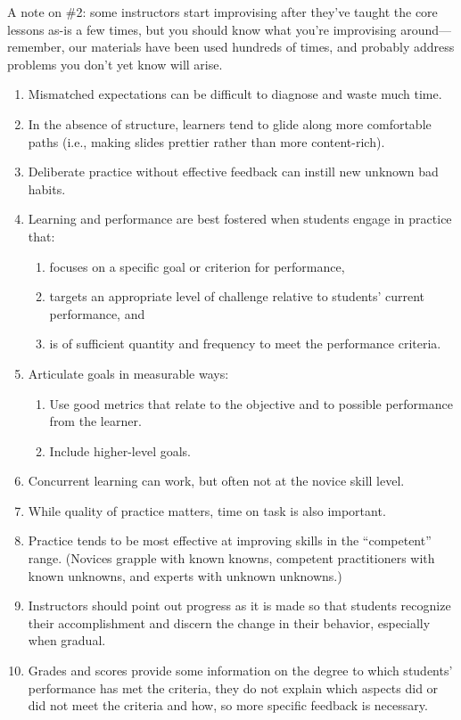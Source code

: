 A note on \#2: some instructors start improvising after they've taught
the core lessons as-is a few times, but you should know what you're
improvising around---remember, our materials have been used hundreds of
times, and probably address problems you don't yet know will arise.


\begin{enumerate}
\item
  Mismatched expectations can be difficult to diagnose and waste much
  time.
\item
  In the absence of structure, learners tend to glide along more
  comfortable paths (i.e., making slides prettier rather than more
  content-rich).
\item
  Deliberate practice without effective feedback can instill new unknown
  bad habits.
\item
  Learning and performance are best fostered when students engage in
  practice that:

  \begin{enumerate}
    \item
    focuses on a specific goal or criterion for performance,
  \item
    targets an appropriate level of challenge relative to students'
    current performance, and
  \item
    is of sufficient quantity and frequency to meet the performance
    criteria.
  \end{enumerate}
\item
  Articulate goals in measurable ways:

  \begin{enumerate}
    \item
    Use good metrics that relate to the objective and to possible
    performance from the learner.
  \item
    Include higher-level goals.
  \end{enumerate}
\item
  Concurrent learning can work, but often not at the novice skill level.
\item
  While quality of practice matters, time on task is also important.
\item
  Practice tends to be most effective at improving skills in the
  ``competent'' range. (Novices grapple with known knowns, competent
  practitioners with known unknowns, and experts with unknown unknowns.)
\item
  Instructors should point out progress as it is made so that students
  recognize their accomplishment and discern the change in their
  behavior, especially when gradual.
\item
  Grades and scores provide some information on the degree to which
  students' performance has met the criteria, they do not explain which
  aspects did or did not meet the criteria and how, so more specific
  feedback is necessary.
\end{enumerate}

